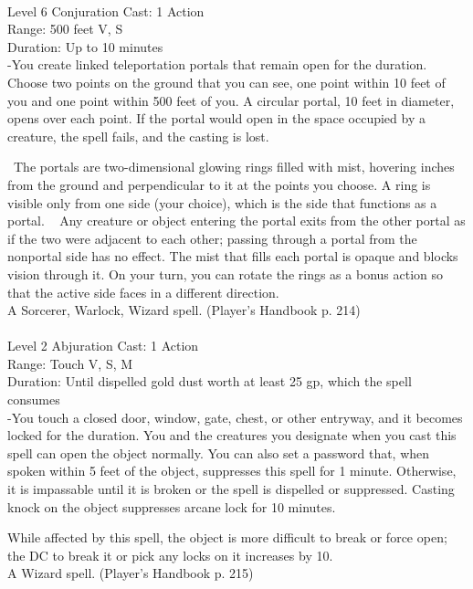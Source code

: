 \documentclass[10pt,twocolumn]{report}
\begin{document}
 \\
Level 6 \quad Conjuration \quad Cast: 1 Action\\
Range: 500 feet \quad V, S\\
Duration: Up to 10 minutes \quad \\
-You create linked teleportation portals that remain open for the duration. 
Choose two points on the ground that you can see, one point within 10 feet of you and one point within 500 feet of you. A circular portal, 10 feet in diameter, opens over each point. If the portal would open in the space occupied by a creature, the spell fails, and the casting is lost. 

 The portals are two-dimensional glowing rings filled with mist, hovering inches from the ground and perpendicular to it at the points you choose. A ring is visible only from one side (your choice), which is the side that functions as a portal. 
 
Any creature or object entering the portal exits from the other portal as if the two were adjacent to each other; passing through a portal from the nonportal side has no effect. The mist that fills each portal is opaque and blocks vision through it. On your turn, you can rotate the rings as a bonus action so that the active side faces in a different direction.\\
A Sorcerer, Warlock, Wizard spell. (Player's Handbook p. 214) \\


 \\
Level 2 \quad Abjuration \quad Cast: 1 Action\\
Range: Touch \quad V, S, M\\
Duration: Until dispelled \quad gold dust worth at least 25 gp, which the spell consumes\\
-You touch a closed door, window, gate, chest, or other entryway, and it becomes locked for the duration. 
You and the creatures you designate when you cast this spell can open the object normally. You can also set a password that, when spoken within 5 feet of the object, suppresses this spell for 1 minute. Otherwise, it is impassable until it is broken or the spell is dispelled or suppressed. Casting knock on the object suppresses arcane lock for 10 minutes. 

While affected by this spell, the object is more difficult to break or force open; the DC to break it or pick any locks on it increases by 10.\\
A Wizard spell. (Player's Handbook p. 215) \\
\end{document}
